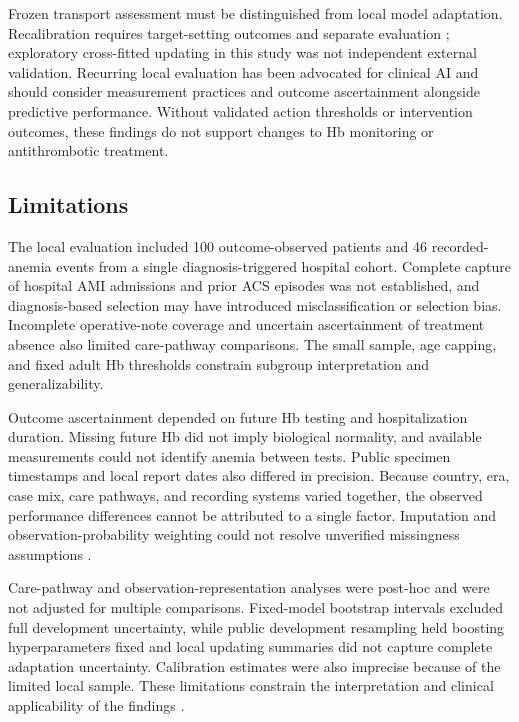 \documentclass[pdflatex,sn-mathphys-num]{sn-jnl}%
\theoremstyle{thmstyleone}%
\theoremstyle{thmstyletwo}%
\theoremstyle{thmstylethree}%
\begin{document}
Frozen transport assessment must be distinguished from local model adaptation. Recalibration requires target-setting outcomes and separate evaluation \cite{steyerberg2004}; exploratory cross-fitted updating in this study was not independent external validation. Recurring local evaluation has been advocated for clinical AI \cite{youssef2023} and should consider measurement practices and outcome ascertainment alongside predictive performance. Without validated action thresholds or intervention outcomes, these findings do not support changes to Hb monitoring or antithrombotic treatment.

\subsection{Limitations}

The local evaluation included 100 outcome-observed patients and 46 recorded-anemia events from a single diagnosis-triggered hospital cohort. Complete capture of hospital AMI admissions and prior ACS episodes was not established, and diagnosis-based selection may have introduced misclassification or selection bias. Incomplete operative-note coverage and uncertain ascertainment of treatment absence also limited care-pathway comparisons. The small sample, age capping, and fixed adult Hb thresholds constrain subgroup interpretation and generalizability.

Outcome ascertainment depended on future Hb testing and hospitalization duration. Missing future Hb did not imply biological normality, and available measurements could not identify anemia between tests. Public specimen timestamps and local report dates also differed in precision. Because country, era, case mix, care pathways, and recording systems varied together, the observed performance differences cannot be attributed to a single factor. Imputation and observation-probability weighting could not resolve unverified missingness assumptions \cite{sterne2009}.

Care-pathway and observation-representation analyses were post-hoc and were not adjusted for multiple comparisons. Fixed-model bootstrap intervals excluded full development uncertainty, while public development resampling held boosting hyperparameters fixed and local updating summaries did not capture complete adaptation uncertainty. Calibration estimates were also imprecise because of the limited local sample. These limitations constrain the interpretation and clinical applicability of the findings \cite{probastai}.
\end{document}

